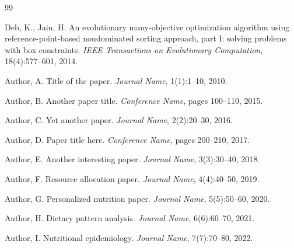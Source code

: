 \documentclass[12pt,a4paper]{article}
\begin{document}

\begin{thebibliography}{99}

Deb, K., Jain, H.
\newblock An evolutionary many-objective optimization algorithm using reference-point-based nondominated sorting approach, part I: solving problems with box constraints.
\newblock \emph{IEEE Transactions on Evolutionary Computation}, 18(4):577--601, 2014.

Author, A.
\newblock Title of the paper.
\newblock \emph{Journal Name}, 1(1):1--10, 2010.

Author, B.
\newblock Another paper title.
\newblock \emph{Conference Name}, pages 100--110, 2015.

Author, C.
\newblock Yet another paper.
\newblock \emph{Journal Name}, 2(2):20--30, 2016.

Author, D.
\newblock Paper title here.
\newblock \emph{Conference Name}, pages 200--210, 2017.

Author, E.
\newblock Another interesting paper.
\newblock \emph{Journal Name}, 3(3):30--40, 2018.

Author, F.
\newblock Resource allocation paper.
\newblock \emph{Journal Name}, 4(4):40--50, 2019.

Author, G.
\newblock Personalized nutrition paper.
\newblock \emph{Journal Name}, 5(5):50--60, 2020.

Author, H.
\newblock Dietary pattern analysis.
\newblock \emph{Journal Name}, 6(6):60--70, 2021.

Author, I.
\newblock Nutritional epidemiology.
\newblock \emph{Journal Name}, 7(7):70--80, 2022.

\end{thebibliography}
\end{document}
